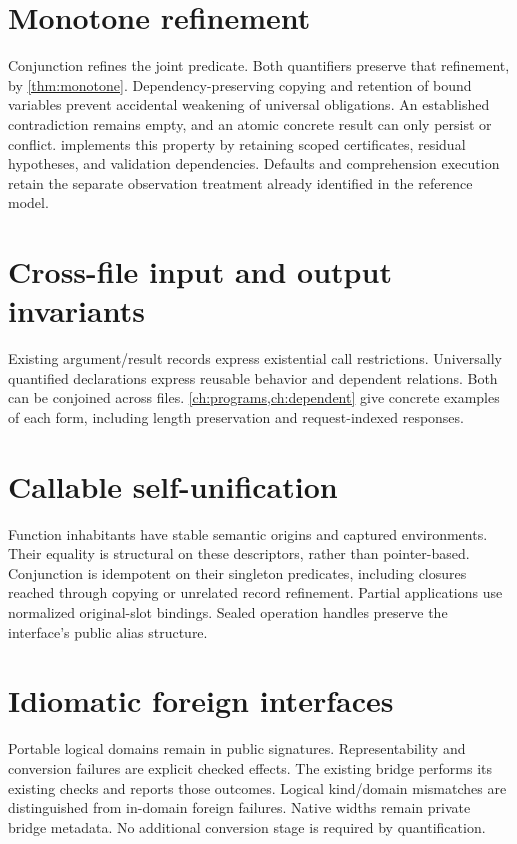\documentclass[11pt,a4paper,oneside]{report}
\theoremstyle{remark}
\newcounter{example}[chapter]
\begin{document}
\section{Monotone refinement}
Conjunction refines the joint predicate. Both quantifiers preserve that
refinement, by \cref{thm:monotone}. Dependency-preserving copying and retention
of bound variables prevent accidental weakening of universal obligations.
An established contradiction remains empty, and an atomic concrete result can
only persist or conflict.  implements this property by retaining
scoped certificates, residual hypotheses, and validation dependencies. Defaults and comprehension execution retain the
separate observation treatment already identified in the reference model.

\section{Cross-file input and output invariants}
Existing argument/result records express existential call restrictions.
Universally quantified declarations express reusable behavior and dependent
relations. Both can be conjoined across files. \cref{ch:programs,ch:dependent}
give concrete examples of each form, including length preservation and
request-indexed responses.

\section{Callable self-unification}
Function inhabitants have stable semantic origins and captured environments.
Their equality is structural on these descriptors, rather than pointer-based.
Conjunction is idempotent on their singleton predicates, including closures
reached through copying or unrelated record refinement. Partial applications
use normalized original-slot bindings. Sealed operation handles preserve the
interface's public alias structure.

\section{Idiomatic foreign interfaces}
Portable logical domains remain in public signatures. Representability and
conversion failures are explicit checked effects. The existing bridge performs
its existing checks and reports those outcomes. Logical kind/domain mismatches
are distinguished from in-domain foreign failures. Native widths remain private
bridge metadata. No additional conversion stage is required by quantification.
\end{document}
